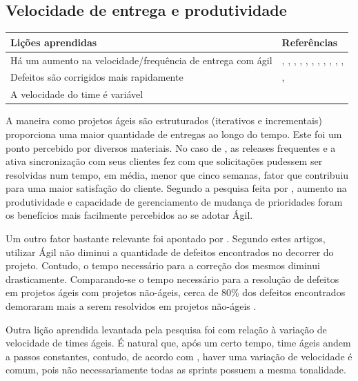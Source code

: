 \subsection{Velocidade de entrega e produtividade}

\begin{table}[H]
	\centering
	\begin{tabularx}{\linewidth}{ | X | p{5cm} | } \hline \textbf{Lições aprendidas} & \textbf{Referências} \\ \hline
		Há um aumento na velocidade/frequência de entrega com ágil & \cite{Adobe2012}, \cite{Fitzgerald2013}, \cite{Microsoft2013}, \cite{Cisco2011}, \cite{Korhonen2010}, \cite{Eunha2012}, \cite{Claudia2013}, \cite{Stefano2013}, \cite{Queiroz2013}, \cite{Maciel2013}, \cite{Hui2013}, \cite{Ahmed2008} \\ \hline
		Defeitos são corrigidos mais rapidamente & \cite{Microsoft2013}, \cite{Korhonen2010} \\ \hline
		A velocidade do time é variável & \cite{Piegas2012} \\ \hline
	\end{tabularx}
\end{table}

A maneira como projetos ágeis são estruturados (iterativos e incrementais) proporciona uma maior quantidade de entregas ao longo do tempo. Este foi um ponto percebido por diversos materiais. No caso de \cite{Fitzgerald2013}, as releases frequentes e a ativa sincronização com  seus clientes fez com que solicitações pudessem ser resolvidas num tempo, em média, menor que cinco semanas, fator que contribuiu para uma maior satisfação do cliente. Segundo a pesquisa feita por \cite{Claudia2013}, aumento na produtividade e capacidade de gerenciamento de mudança de prioridades foram os benefícios mais facilmente percebidos ao se adotar Ágil.

Um outro fator bastante relevante foi apontado por \cite{Microsoft2013,Korhonen2010}. Segundo estes artigos, utilizar Ágil não diminui a quantidade de defeitos encontrados no decorrer do projeto. Contudo, o tempo necessário para a correção dos mesmos diminui drasticamente. Comparando-se o tempo necessário para a resolução de defeitos em projetos ágeis com projetos não-ágeis, cerca de 80\% dos defeitos encontrados demoraram mais a serem resolvidos em projetos não-ágeis \cite{Korhonen2010}.

Outra lição aprendida levantada pela pesquisa foi com relação à variação de velocidade de times ágeis. É natural que, após um certo tempo, time ágeis andem a passos constantes, contudo, de acordo com \cite{Piegas2012}, haver uma variação de velocidade é comum, pois não necessariamente todas as sprints possuem a mesma tonalidade.

